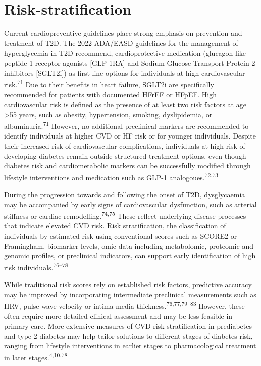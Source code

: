 \documentclass[
  a4paper,
  headsepline=true,
  open=left]{scrbook}
\begin{document}
\hypertarget{risk-stratification}{%
\section{Risk-stratification}\label{risk-stratification}}

Current cardiopreventive guidelines place strong emphasis on prevention
and treatment of T2D. The 2022 ADA/EASD guidelines for the management of
hyperglycemia in T2D recommend, cardioprotective medication
(glucagon-like peptide-1 receptor agonists {[}GLP-1RA{]} and
Sodium-Glucose Transport Protein 2 inhibitors {[}SGLT2i{]}) as
first-line options for individuals at high cardiovascular
risk.\textsuperscript{71} Due to their benefits in heart failure, SGLT2i
are specifically recommended for patients with documented HFrEF or
HFpEF. High cardiovascular risk is defined as the presence of at least
two risk factors at age \textgreater55 years, such as obesity,
hypertension, smoking, dyslipidemia, or albuminuria.\textsuperscript{71}
However, no additional preclinical markers are recommended to identify
individuals at higher CVD or HF risk or for younger individuals. Despite
their increased risk of cardiovascular complications, individuals at
high risk of developing diabetes remain outside structured treatment
options, even though diabetes risk and cardiometabolic markers can be
successfully modified through lifestyle interventions and medication
such as GLP-1 analogoues.\textsuperscript{72,73}

During the progression towards and following the onset of T2D,
dysglycaemia may be accompanied by early signs of cardiovascular
dysfunction, such as arterial stiffness or cardiac
remodelling.\textsuperscript{74,75} These reflect underlying disease
processes that indicate elevated CVD risk. Risk stratification, the
classification of individuals by estimated risk using conventional
scores such as SCORE2 or Framingham, biomarker levels, omic data
including metabolomic, proteomic and genomic profiles, or preclinical
indicators, can support early identification of high risk
individuals.\textsuperscript{76--78}

While traditional risk scores rely on established risk factors,
predictive accuracy may be improved by incorporating intermediate
preclinical measurements such as HRV, pulse wave velocity or intima
media thickness.\textsuperscript{76,77,79--83} However, these often
require more detailed clinical assessment and may be less feasible in
primary care. More extensive measures of CVD risk stratification in
prediabetes and type 2 diabetes may help tailor solutions to different
stages of diabetes risk, ranging from lifestyle interventions in earlier
stages to pharmacological treatment in later
stages.\textsuperscript{4,10,78}
\end{document}

